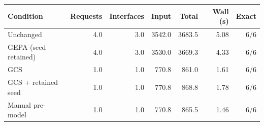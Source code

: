 \begin{tabular}{lrrrrrr}
\toprule
Condition & Requests & Interfaces & Input & Total & Wall (s) & Exact \\
\midrule
Unchanged & 4.0 & 3.0 & 3542.0 & 3683.5 & 5.08 & 6/6 \\
GEPA (seed retained) & 4.0 & 3.0 & 3530.0 & 3669.3 & 4.33 & 6/6 \\
GCS & 1.0 & 1.0 & 770.8 & 861.0 & 1.61 & 6/6 \\
GCS + retained seed & 1.0 & 1.0 & 770.8 & 868.8 & 1.78 & 6/6 \\
Manual pre-model & 1.0 & 1.0 & 770.8 & 865.5 & 1.46 & 6/6 \\
\bottomrule
\end{tabular}
